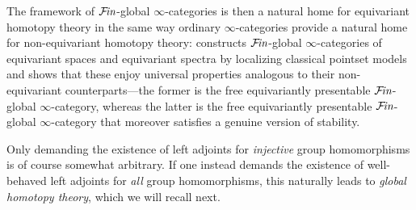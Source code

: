 \documentclass[reqno]{memo-l}
\theoremstyle{mythm}
\theoremstyle{definition}
\numberwithin{equation}{section}
\newcommand{\Fin}{\hbox{$\mathcal F\kern-1.7pt\textit{in}$}}
\begin{document}
The framework of $\Fin$-global $\infty$-categories is then a natural home for equivariant homotopy theory in the same way ordinary $\infty$-categories provide a natural home for non-equivariant homotopy theory: \cite{CLL_Clefts} constructs $\Fin$-global $\infty$-categories of equivariant spaces and equivariant spectra by localizing classical pointset models and shows that these enjoy universal properties analogous to their non-equivariant counterparts---the former is the free equivariantly presentable $\Fin$-global $\infty$-category, whereas the latter is the free equivariantly presentable $\Fin$-global $\infty$-category that moreover satisfies a genuine version of stability.

Only demanding the existence of left adjoints for \emph{injective} group homomorphisms is of course somewhat arbitrary. If one instead demands the existence of well-behaved left adjoints for \emph{all} group homomorphisms, this naturally leads to \emph{global homotopy theory}, which we will recall next.
\end{document}
